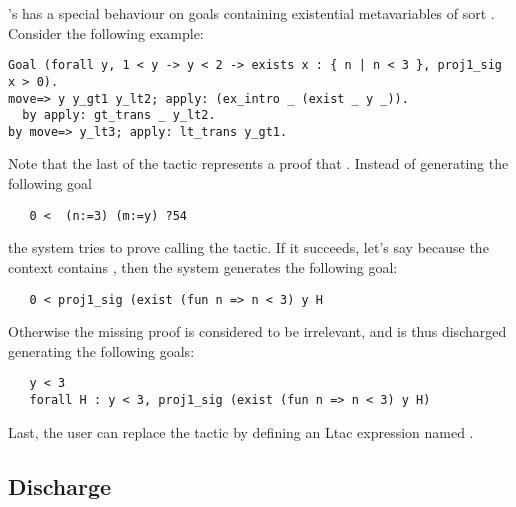 \ssr{}'s  has a special behaviour on goals containing
existential metavariables of sort .  Consider the
following example:
\begin{lstlisting}
Goal (forall y, 1 < y -> y < 2 -> exists x : { n | n < 3 }, proj1_sig x > 0).
move=> y y_gt1 y_lt2; apply: (ex_intro _ (exist _ y _)).
  by apply: gt_trans _ y_lt2.
by move=> y_lt3; apply: lt_trans y_gt1.
\end{lstlisting}
Note that the last \ssrC{_} of the tactic 
represents a proof that . Instead of generating the following
goal
\begin{lstlisting}
   0 <  (n:=3) (m:=y) ?54
\end{lstlisting}
\noindent the system tries to prove  calling the 
tactic. If it succeeds, let's say because the context contains
, then the system generates the following goal:
\begin{lstlisting}
   0 < proj1_sig (exist (fun n => n < 3) y H
\end{lstlisting}
\noindent Otherwise the missing proof is considered to be irrelevant, and
is thus discharged generating the following goals:
\begin{lstlisting}
   y < 3
   forall H : y < 3, proj1_sig (exist (fun n => n < 3) y H)
\end{lstlisting}
Last, the user can replace the  tactic by defining
an Ltac expression named .


\subsection{Discharge}\label{ssec:discharge}
\idx{\dots{} : \dots{}}

